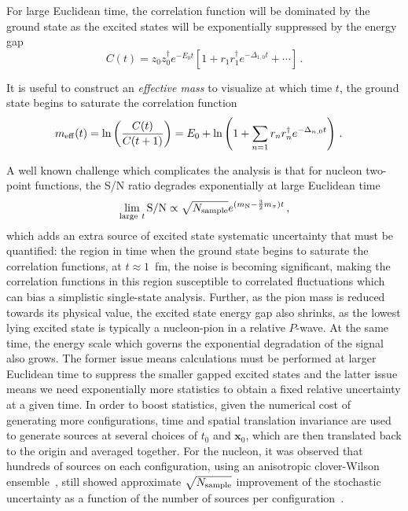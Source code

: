 \documentclass{ar-1col}
\def\D{\Delta}
\begin{document}
For large Euclidean time, the correlation function will be dominated by the ground state as the excited states will be exponentially suppressed by the energy gap
\begin{equation}
    C(t) = z_0 z_0^\dagger e^{-E_0 t}\left[
        1 + r_1 r^\dagger_1 e^{-\Delta_{1,0}t} + \cdots \right]\, .
\end{equation}%
\begin{marginnote}
\entry{$\D_{m,n}= E_m - E_n$}{energy gap}
\end{marginnote}%
It is useful to construct an \textit{effective mass} to visualize at which time $t$, the ground state begins to saturate the correlation function
\begin{align}
m_{\rm eff}(t) &= \ln \left( \frac{C(t)}{C(t+1)} \right)
    =
    E_0 + \ln\left( 1 + \sum_{n=1} r_n r^\dagger_n e^{-\Delta_{n,0}t}\right)\, .
\end{align}


A well known challenge which complicates the analysis is that for nucleon two-point functions, the S/N ratio degrades exponentially at large Euclidean time~\cite{Lepage:1989hd}
\begin{equation}
\lim_{{\rm large}\ t} {\rm S/N}%
    \propto \sqrt{N_{\mathrm{sample}}} e^{(m_{\mathrm{N}} - \frac{3}{2}m_\pi)t}\, ,
\end{equation}
which adds an extra source of excited state systematic uncertainty that must be quantified:
the region in time when the ground state begins to saturate the correlation functions, at $t\approx 1$~fm, the noise is becoming significant, making the correlation functions in this region susceptible to correlated fluctuations which can bias a simplistic single-state analysis.
Further, as the pion mass is reduced towards its physical value, the excited state energy gap also shrinks, as the lowest lying excited state is typically a nucleon-pion in a relative $P$-wave.  At the same time, the energy scale which governs the exponential degradation of the signal also grows.  The former issue means calculations must be performed at larger Euclidean time to suppress the smaller gapped excited states and the latter issue means we need exponentially more statistics to obtain a fixed relative uncertainty at a given time.
In order to boost statistics, given the numerical cost of generating more configurations, time and spatial translation invariance are used to generate sources at several choices of $t_0$ and $\mathbf{x}_0$, which are then translated back to the origin and averaged together.  For the nucleon, it was observed that hundreds of sources on each configuration, using an anisotropic clover-Wilson ensemble~\cite{HadronSpectrum:2008xlg}, still showed approximate $\sqrt{N_{\rm sample}}$ improvement of the stochastic uncertainty as a function of the number of sources per configuration~\cite{Beane:2009kya}.
\end{document}
